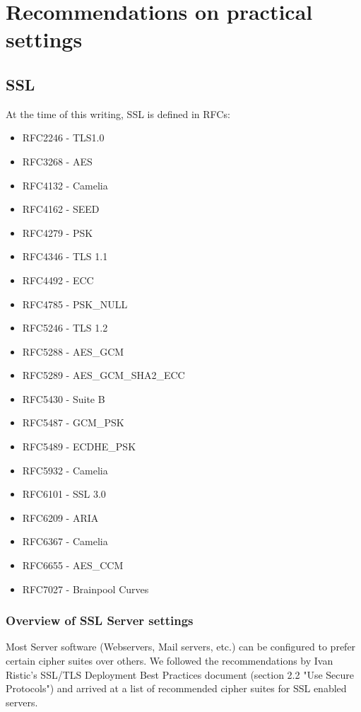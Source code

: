 \section{Recommendations on practical settings}


\subsection{SSL}

At the time of this writing, SSL is defined in RFCs: 	

\begin{itemize}
\item RFC2246 - TLS1.0		
\item RFC3268 - AES		
\item RFC4132 - Camelia		
\item RFC4162 - SEED		
\item RFC4279 - PSK		
\item RFC4346 - TLS 1.1		
\item RFC4492 - ECC		
\item RFC4785 - PSK\_NULL		
\item RFC5246 - TLS 1.2		
\item RFC5288 - AES\_GCM		
\item RFC5289 - AES\_GCM\_SHA2\_ECC		
\item RFC5430 - Suite B		
\item RFC5487 - GCM\_PSK		
\item RFC5489 - ECDHE\_PSK		
\item RFC5932 - Camelia		
\item RFC6101 - SSL 3.0		
\item RFC6209 - ARIA		
\item RFC6367 - Camelia		
\item RFC6655 - AES\_CCM		
\item RFC7027 - Brainpool Curves		
\end{itemize}

\subsubsection{Overview of SSL Server settings}

Most Server software (Webservers, Mail servers, etc.) can be configured to prefer certain cipher suites over others. 
We followed the recommendations by Ivan Ristic's \cite{RisticSSLTLSDeploymentBestPractices}SSL/TLS Deployment Best Practices document (section 2.2 "Use Secure Protocols") and arrived at a list of recommended cipher suites for SSL enabled servers.

